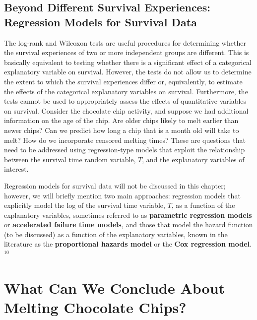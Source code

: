\documentclass[
]{book}
\begin{document}
\hypertarget{beyond-different-survival-experiences-regression-models-for-survival-data}{%
\subsection*{Beyond Different Survival Experiences: Regression Models for Survival Data}\label{beyond-different-survival-experiences-regression-models-for-survival-data}}

The log-rank and Wilcoxon tests are useful procedures for determining whether the survival experiences of two or more independent groups are different. This is basically equivalent to testing whether there is a significant effect of a categorical explanatory variable on survival. However, the tests do not allow us to determine the extent to which the survival experiences differ or, equivalently, to estimate the effects of the categorical explanatory variables on survival. Furthermore, the tests cannot be used to appropriately assess the effects of quantitative variables on survival. Consider the chocolate chip activity, and suppose we had additional information on the age of the chip. Are older chips likely to melt earlier than newer chips? Can we predict how long a chip that is a month old will take to melt? How do we incorporate censored melting times? These are questions that need to be addressed using regression-type models that exploit the relationship between the survival time random variable, \(T\), and the explanatory variables of interest.

Regression models for survival data will not be discussed in this chapter; however, we will briefly mention two main approaches: regression models that explicitly model the log of the survival time variable, \(T\), as a function of the explanatory variables, sometimes referred to as \textbf{parametric regression models} or \textbf{accelerated failure time models}, and those that model the hazard function (to be discussed) as a function of the explanatory variables, known in the literature as the \textbf{proportional hazards model} or the \textbf{Cox regression model}.\(^10\)

\hypertarget{what-can-we-conclude-about-melting-chocolate-chips}{%
\section{What Can We Conclude About Melting Chocolate Chips?}\label{what-can-we-conclude-about-melting-chocolate-chips}}
\end{document}
